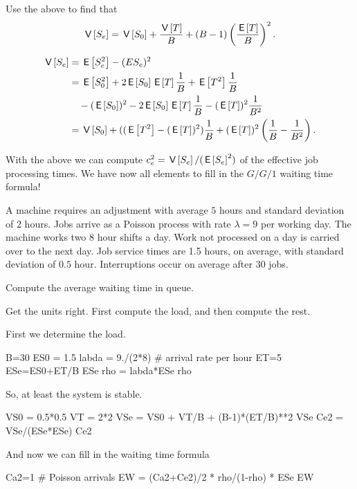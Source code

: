 \begin{exercise}
  Use the above to find that
  \begin{equation*}
    \,\mathsf{V}\left[S_e\right] = \,\mathsf{V}\left[S_0\right] + \frac{\,\mathsf{V}\left[T\right]} B + (B-1)\left(\frac{\,\mathsf{E}\left[T\right]}{B}\right)^2.
  \end{equation*}
  \begin{solution}
    \begin{equation*}
      \begin{split}
\,\mathsf{V}\left[S_e\right] 
&=\,\mathsf{E}\left[S_e^2\right] - (E{S_e})^2 \\
&= \,\mathsf{E}\left[S_0^2\right] + 2 \,\mathsf{E}\left[S_0\right] \,\mathsf{E}\left[T\right]\frac 1B + \,\mathsf{E}\left[T^2\right]\frac 1B  \\
&\quad - (\,\mathsf{E}\left[S_0\right])^2 - 2\,\mathsf{E}\left[S_0\right]\,\mathsf{E}\left[T\right] \frac 1 B - (\,\mathsf{E}\left[T\right])^2\frac1{B^2}\\
&=  \,\mathsf{V}\left[S_0\right] + ((\,\mathsf{E}\left[T^2\right] - (\,\mathsf{E}\left[T\right])^2)\frac 1 B + (\,\mathsf{E}\left[T\right])^2\left(\frac 1B - \frac 1{B^2}\right).
      \end{split}
    \end{equation*}
  \end{solution}
\end{exercise}

With the above we can compute $c_e^2=\,\mathsf{V}\left[S_e\right]/(\,\mathsf{E}\left[S_e\right]^2)$ of the effective job processing times. We have now all elements to fill in the $G/G/1$ waiting time formula!

\begin{exercise}
A machine requires an adjustment with average $5$ hours and standard deviation of $2$ hours. Jobs arrive as a Poisson process with rate $\lambda=9$ per working day. The machine works two $8$ hour shifts a day. Work not processed on a day is carried over to the next day. Job service times are 1.5 hours, on average, with standard deviation of $0.5$ hour. Interruptions occur on average after $30$ jobs.

Compute the average waiting time in queue.
\begin{hint}
  Get the units right. First compute the load, and then compute the rest.
\end{hint}
\begin{solution}
  First we determine the load. 
  \begin{pyconsole}
B=30
ES0 = 1.5
labda = 9./(2*8) # arrival rate per hour
ET=5
ESe=ES0+ET/B
ESe
rho = labda*ESe
rho
  \end{pyconsole}
So, at least the system is stable.

\begin{pyconsole}
VS0 = 0.5*0.5
VT = 2*2
VSe = VS0 + VT/B + (B-1)*(ET/B)**2
VSe
Ce2 = VSe/(ESe*ESe)
Ce2
\end{pyconsole}

And now we can fill in the waiting time formula
\begin{pyconsole}
Ca2=1 # Poisson arrivals
EW = (Ca2+Ce2)/2 * rho/(1-rho) * ESe
EW  
\end{pyconsole}
\end{solution}
\end{exercise}

